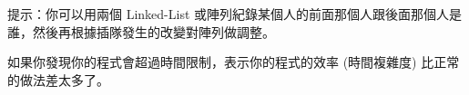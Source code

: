 提示：你可以用兩個 Linked-List 或陣列紀錄某個人的前面那個人跟後面那個人是誰，然後再根據插隊發生的改變對陣列做調整。

如果你發現你的程式會超過時間限制，表示你的程式的效率 (時間複雜度) 比正常的做法差太多了。
